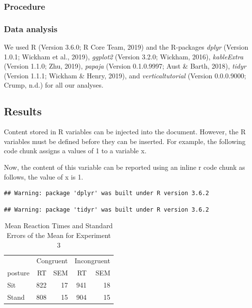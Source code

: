 \documentclass[
  english,
  man]{apa6}
\begin{document}
\hypertarget{procedure}{%
\subsubsection{Procedure}\label{procedure}}

\hypertarget{data-analysis}{%
\subsubsection{Data analysis}\label{data-analysis}}

We used R (Version 3.6.0; R Core Team, 2019) and the R-packages \emph{dplyr} (Version 1.0.1; Wickham et al., 2019), \emph{ggplot2} (Version 3.2.0; Wickham, 2016), \emph{kableExtra} (Version 1.1.0; Zhu, 2019), \emph{papaja} (Version 0.1.0.9997; Aust \& Barth, 2018), \emph{tidyr} (Version 1.1.1; Wickham \& Henry, 2019), and \emph{verticaltutorial} (Version 0.0.0.9000; Crump, n.d.) for all our analyses.

\hypertarget{results}{%
\subsection{Results}\label{results}}

Content stored in R variables can be injected into the document. However, the R variables must be defined before they can be inserted. For example, the following code chunk assigns a values of 1 to a variable x.

Now, the content of this variable can be reported using an inline r code chunk as follows, the value of x is 1.

\begin{verbatim}
## Warning: package 'dplyr' was built under R version 3.6.2
\end{verbatim}

\begin{verbatim}
## Warning: package 'tidyr' was built under R version 3.6.2
\end{verbatim}

\begin{table}

\caption{\label{tab:meanstable}Mean Reaction Times and Standard Errors of the Mean for Experiment 3}
\centering
\begin{tabular}[t]{lrrrr}
\toprule
\multicolumn{1}{c}{ } & \multicolumn{2}{c}{Congruent} & \multicolumn{2}{c}{Incongruent} \\
\cmidrule(l{3pt}r{3pt}){2-3} \cmidrule(l{3pt}r{3pt}){4-5}
posture & RT & SEM & RT & SEM\\
\midrule
Sit & 822 & 17 & 941 & 18\\
Stand & 808 & 15 & 904 & 15\\
\bottomrule
\end{tabular}
\end{table}
\end{document}

